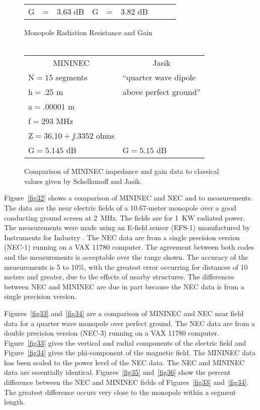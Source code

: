 \documentclass[12pt]{article}
\begin{document}
\begin{figure}[ht]
\begin{tabular}{lcllcllcl}
G & = & 3.63 dB   & G & = & 3.82 dB   \\
\end{tabular}
\begin{center}
Monopole Radiation Resistance and Gain\\\ \\
\begin{tabular}{ll}
\multicolumn{1}{c}{MININEC} & \multicolumn{1}{c}{Jasik} \\
N${}=15$ segments            & ``quarter wave dipole    \\
h${}=.25$ m                  & above perfect ground''   \\
a${}=.00001$ m               &                          \\
f${}=293$ MHz                &                          \\
Z${}=36.10+\jj.3352$ ohms    &                          \\
G${}=5.145$ dB               & G${}=5.15$ dB            \\
\end{tabular}
\end{center}
\caption{Comparison of MININEC impedance and gain data to classical
values given by Schelkunoff and Jasik.}
\label{fig40}
\end{figure}
\afterpage\clearpage

Figure~\ref{fig32} shows a comparison of MININEC and NEC and to
measurements. The data are the near electric fields of a 10.67-meter
monopole over a good conducting ground screen at 2~MHz. The fields are
for 1~KW radiated power. The measurements were made using an E-field
sensor (EFS-1) manufactured by Instruments for Industry
\cite{r21}. The NEC data are from a single precision version
(NEC-1) running on a VAX 11780 computer. The agreement between both
codes and the measurements is acceptable over the range shown. The
accuracy of the measurements is 5 to 10\%, with the greatest error
occurring for distances of 10 meters and greater, due to the effects of
nearby structures. The differences between NEC and MININEC are due in
part because the NEC data is from a single precision version.

Figures~\ref{fig33} and~\ref{fig34} are a comparison of MININEC and NEC
near field data for a quarter wave monopole over perfect ground. The NEC
data are from a double precision version (NEC-3) running on a VAX 11780
computer. Figure~\ref{fig33} gives the vertical and radial components of
the electric field and Figure~\ref{fig34} gives the phi-component of the
magnetic field. The MININEC data has been scaled to the power level of
the NEC data. The NEC and MININEC data are essentially identical.
Figures~\ref{fig35} and~\ref{fig36} show the percent difference between
the NEC and MININEC fields of Figures~\ref{fig33} and~\ref{fig34}. The
greatest difference occurs very close to the monopole within a segment
length.
\end{document}
